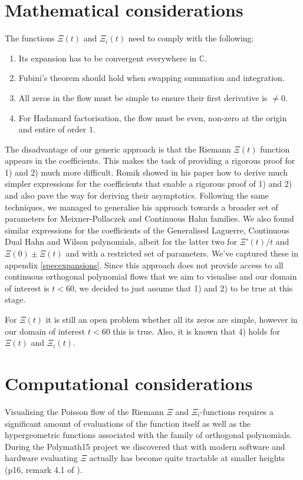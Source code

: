 \documentclass[a4paper,11pt,twoside]{amsart}
\begin{document}
\section{Mathematical considerations}\label{mathcons}
The functions $\Xi(t)$ and $\Xi_i(t)$ need to comply with the following:
\begin{enumerate}
\item Its expansion has to be convergent everywhere in $\mathbb{C}$.
\item Fubini's theorem should hold when swapping summation and integration.
\item All zeros in the flow must be simple to ensure their first derivative is $\ne 0$.
\item For Hadamard factorisation, the flow must be even, non-zero at the origin and entire of order $1$. 
\end{enumerate} 

The disadvantage of our generic approach is that the Riemann $\Xi(t)$ function appears in the coefficients. This makes the task of providing a rigorous proof for 1) and 2) much more difficult. Romik showed in his paper how to derive much simpler expressions for the coefficients that enable a rigorous proof of 1) and 2) and also pave the way for deriving their asymptotics. Following the same techniques, we managed to generalise his approach towards a broader set of parameters for Meixner-Pollaczek and Continuous Hahn families. We also found similar expressions for the coefficients of the Generalised Laguerre, Continuous Dual Hahn and Wilson polynomials, albeit for the latter two for $\Xi'(t)/t$ and $\Xi(0) \pm \Xi(t)$ and with a restricted set of parameters. We've captured these in appendix \ref{specexpansions}. Since this approach does not provide access to all continuous orthogonal polynomial flows that we aim to visualise and our domain of interest is $t < 60$, we decided to just assume that 1) and 2) to be true at this stage.

For $\Xi(t)$ it is still an open problem whether all its zeros are simple, however in our domain of interest $t < 60$ this is true. Also, it is known that 4) holds for $\Xi(t)$ and $\Xi_i(t)$.    

\section{Computational considerations}\label{compcons}
Visualising the Poisson flow of the Riemann $\Xi$ and $\Xi_i$-functions requires a significant amount of evaluations of the function itself as well as the hypergeometric functions associated with the family of orthogonal polynomials. During the Polymath15 project we discovered that with modern software and hardware evaluating $\Xi$ actually has become quite tractable at smaller heights (p16, remark 4.1 of \cite{pol}). 
\end{document}
